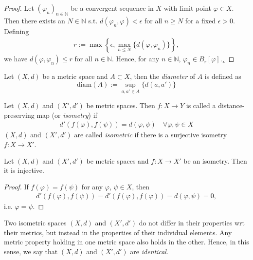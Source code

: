 \begin{proof}
	Let $(\varphi_n)_{n\in\mathbb N}$ be a convergent sequence in $X$ with limit point $\varphi\in X$. Then there exists an $N\in\mathbb N$ s.t. $d(\varphi_n, \varphi) < \epsilon$ for all $n\geq N$ for a fixed $\epsilon > 0$. Defining
	\begin{align}
		r := \max \left\{ \epsilon, \max_{n \leq N}\{d(\varphi, \varphi_n)\} \right\},
	\end{align}
	we have $d(\varphi, \varphi_n) \leq r$ for all $n\in\mathbb N$. Hence, for any $n\in\mathbb N$, 
	$\varphi_n\in B_{r}[\varphi]$.¸
\end{proof}

\begin{defn}\label{defn:diameter_metric_set}
	Let $(X, d)$ be a metric space and $A\subset X$, then the \textit{diameter} of $A$ is defined as
	$$\text{diam}(A) := \sup_{a, a'\in A}\{d(a, a')\}$$
\end{defn}

\begin{defn}[Isometry]
	Let $(X, d)$ and $(X', d')$ be metric spaces. Then $f: X \rightarrow Y$ is called a distance-preserving map (or \textit{isometry}) if
	\begin{align}
		d'(f(\varphi), f(\psi)) = d(\varphi, \psi) \quad\forall \varphi, \psi\in X
	\end{align}
	$(X, d)$ and $(X', d')$ are called \textit{isometric} if there is a surjective isometry $f:X\rightarrow X'$.
\end{defn}

\begin{theorem}\label{thrm:isometries_injective}
	Let $(X, d)$ and $(X', d')$ be metric spaces and $f: X\rightarrow X'$  be an isometry. Then it is injective.
\end{theorem}

\begin{proof}
	If $f(\varphi) = f(\psi)$ for any $\varphi$, $\psi\in X$, then 
	\begin{align}
		d'(f(\varphi), f(\psi)) = d'(f(\varphi), f(\varphi)) = d(\varphi, \psi) = 0, 
	\end{align}
	i.e. $\varphi = \psi$.
\end{proof}

\begin{remark}
	Two isometric spaces $(X, d)$ and $(X', d')$ do not differ in their properties wrt their metrics, but instead in the properties of their individual elements. Any metric property holding in one metric space also holds in the other. Hence, in this sense, we say that $(X, d)$ and $(X', d')$ are \textit{identical}.
\end{remark}

